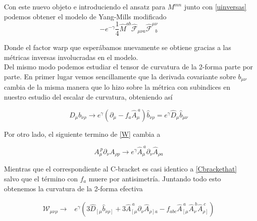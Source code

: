\documentclass{article}
\numberwithin{equation}{section}
\begin{document}
Con este nuevo objeto e introduciendo el ansatz para $ M^{m n} $ junto con \ref{uinversas} podemos obtener el modelo de Yang-Mills modificado\\

\begin{equation}
-e^{- \gamma} \frac{1}{4} \hat{M}^{a b} \hat{\mathcal{F}}_{\mu \nu a} \hat{\mathcal{F}}^{\mu \nu}_{ \ \ \ b}
\end{equation}

Donde el factor warp que esperábamos nuevamente se obtiene gracias a las métricas inversas involucradas en el modelo.\\

Del mismo modo podemos estudiar el tensor de curvatura de la 2-forma parte por parte. En primer lugar vemos sencillamente que la derivada covariante sobre $ b_{\mu \nu} $ cambia de la misma manera que lo hizo sobre la métrica con subindices en nuestro estudio del escalar de curvatura, obteniendo así

\begin{equation}
D_{\mu} b_{\nu \rho} \longrightarrow e^{\gamma} \left( \partial_{\mu} - f_a \hat{A}_{\mu}^{\ a}\right) \hat{b}_{\nu \rho} = e^{\gamma} \hat{D}_{\mu} \hat{b}_{\mu \nu}
\end{equation}

Por otro lado, el siguiente termino de \ref{W} cambia a 

\begin{equation}
A_{\mu}^{\ p} \partial_{\nu} A_{\rho p} \longrightarrow e^{\gamma} \hat{A}_{\mu}^{\ a} \partial_{\nu} \hat{A}_{\rho a}
\end{equation}

Mientras que el correspondiente al C-bracket es casi identico a \ref{Cbrackethat} salvo que el término con $ f_a $ muere por antisimetría. Juntando todo esto obtenemos la curvatura de la 2-forma efectiva\\

\begin{boxquation}
	\begin{equation}
	\begin{aligned}
	\mathcal{W}_{\mu \nu \rho} \longrightarrow& e^{\gamma} \left( 3\hat{D}_{\left[ \mu \right.} \hat{b}_{\left. \nu \rho \right]} + 3 \hat{A}_{\left[ \mu\right.}^{\ a} \partial_{\nu} \hat{A}_{\left. \rho \right] a } - f_{a bc} \hat{A}_{\left[ \mu \right.}^{\ a} \hat{A}_{\nu}^{\ b} \hat{A}_{\left. \rho \right]}^{\ c} \right)
	\end{aligned}
	\end{equation}
\end{boxquation}
\end{document}
